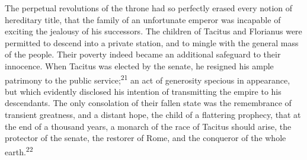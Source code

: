 
The perpetual revolutions of the throne had so perfectly erased
every notion of hereditary title, that the family of an
unfortunate emperor was incapable of exciting the jealousy of his
successors. The children of Tacitus and Florianus were permitted
to descend into a private station, and to mingle with the general
mass of the people. Their poverty indeed became an additional
safeguard to their innocence. When Tacitus was elected by the
senate, he resigned his ample patrimony to the public service;\textsuperscript{21}
an act of generosity specious in appearance, but which evidently
disclosed his intention of transmitting the empire to his
descendants. The only consolation of their fallen state was the
remembrance of transient greatness, and a distant hope, the child
of a flattering prophecy, that at the end of a thousand years, a
monarch of the race of Tacitus should arise, the protector of the
senate, the restorer of Rome, and the conqueror of the whole
earth.\textsuperscript{22}



